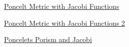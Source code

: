 \documentclass{ximera}
\begin{document}
\href{https://www.desmos.com/calculator/q16ify3gtm}{Poncelt Metric with Jacobi Functions}



\begin{onlineOnly}
    \begin{center}
\end{center}
\end{onlineOnly}

\href{https://www.desmos.com/calculator/hm5zop04ob}{Poncelt Metric with Jacobi Functions 2}



\begin{onlineOnly}
    \begin{center}
\end{center}
\end{onlineOnly}

\href{https://www.desmos.com/calculator/lwbypn9rje}{Poncelets Porism and Jacobi}
\end{document}
